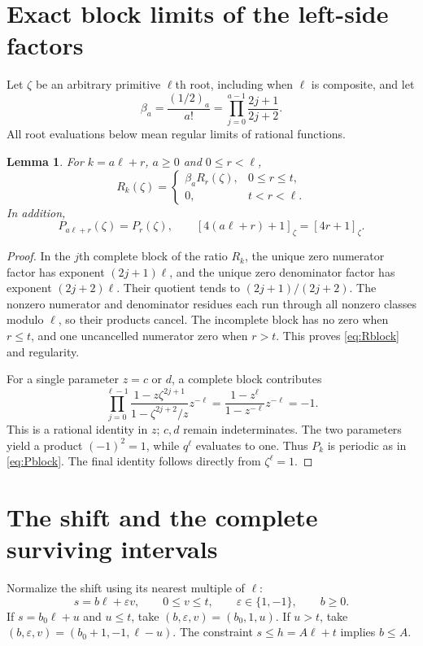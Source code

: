 \documentclass[11pt,a4paper]{article}
\newtheorem{lemma}[theorem]{Lemma}
\begin{document}
\section{Exact block limits of the left-side factors}
Let $\zeta$ be an arbitrary primitive $\ell$th root, including when
$\ell$ is composite, and let
\[
 \beta_a=\frac{(1/2)_a}{a!}=\prod_{j=0}^{a-1}\frac{2j+1}{2j+2}.
\]
All root evaluations below mean regular limits of rational functions.

\begin{lemma}\label{lem:blocks}
For $k=a\ell+r$, $a\geq0$ and $0\leq r<\ell$,
\begin{equation}\label{eq:Rblock}
 R_k(\zeta)=
 \begin{cases}\beta_a R_r(\zeta),&0\leq r\leq t,\\
 0,&t<r<\ell.
 \end{cases}
\end{equation}
In addition,
\begin{equation}\label{eq:Pblock}
 P_{a\ell+r}(\zeta)=P_r(\zeta),\qquad
 [4(a\ell+r)+1]_\zeta=[4r+1]_\zeta.
\end{equation}
\end{lemma}
\begin{proof}
In the $j$th complete block of the ratio $R_k$, the unique zero numerator
factor has exponent $(2j+1)\ell$, and the unique zero denominator factor
has exponent $(2j+2)\ell$. Their quotient tends to
$(2j+1)/(2j+2)$. The nonzero numerator and denominator residues each run
through all nonzero classes modulo $\ell$, so their products cancel.
The incomplete block has no zero when $r\leq t$, and one uncancelled
numerator zero when $r>t$. This proves \eqref{eq:Rblock} and regularity.

For a single parameter $z=c$ or $d$, a complete block contributes
\[
 \prod_{j=0}^{\ell-1}\frac{1-z\zeta^{2j+1}}{1-\zeta^{2j+2}/z}
 z^{-\ell}
 =\frac{1-z^\ell}{1-z^{-\ell}}z^{-\ell}=-1.
\]
This is a rational identity in $z$; $c,d$ remain indeterminates. The two
parameters yield a product $(-1)^2=1$, while $q^\ell$ evaluates to one.
Thus $P_k$ is periodic as in \eqref{eq:Pblock}. The final identity follows
directly from $\zeta^\ell=1$.
\end{proof}

\section{The shift and the complete surviving intervals}
Normalize the shift using its nearest multiple of $\ell$:
\begin{equation}\label{eq:signed}
 s=b\ell+\varepsilon v,\qquad 0\leq v\leq t,\qquad
 \varepsilon\in\{1,-1\},\qquad b\geq0.
\end{equation}
If $s=b_0\ell+u$ and $u\leq t$, take $(b,\varepsilon,v)=(b_0,1,u)$.
If $u>t$, take $(b,\varepsilon,v)=(b_0+1,-1,\ell-u)$.
The constraint $s\leq h=A\ell+t$ implies $b\leq A$.
\end{document}
